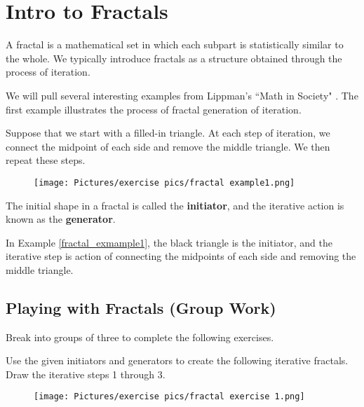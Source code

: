 
\section{Intro to Fractals}

A fractal is a mathematical set in which each subpart is statistically similar to the whole. We typically introduce fractals as a structure obtained through the process of iteration.

\noindent We will pull several interesting examples from Lippman's ``Math in Society" \cite{math_in_society}. The first example illustrates the process of fractal generation of iteration.

\begin{example}\label{fractal_exmample1}
Suppose that we start with a filled-in triangle. At each step of iteration, we connect the midpoint of each side and remove the middle triangle. We then repeat these steps.

\begin{figure}[h]
    \centering
    \texttt{[image: Pictures/exercise pics/fractal example1.png]}
    \label{fig:fractal1}
\end{figure}
\end{example}

\begin{definition}
The initial shape in a fractal is called the \textbf{initiator}, and the iterative action is known as the \textbf{generator}.
\end{definition}

\noindent In Example \ref{fractal_exmample1}, the black triangle is the initiator, and the iterative step is action of connecting the midpoints of each side and removing the middle triangle.

\newpage
 
\subsection{Playing with Fractals (Group Work)} 

Break into groups of three to complete the following exercises.


\begin{exercise}
Use the given initiators and generators to create the following iterative fractals. Draw the iterative steps 1 through 3.
\end{exercise}
\begin{figure}[h]
    \centering
    \texttt{[image: Pictures/exercise pics/fractal exercise 1.png]}
    \label{fig:fractalex1}
\end{figure}

